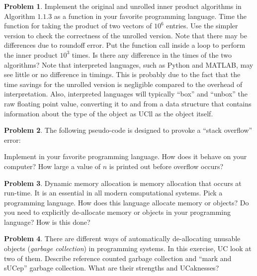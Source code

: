 \documentclass{article}
\theoremstyle{definition}
\newtheorem{problem}{Problem}[subsection]
\newcommand{\courier}[1]{{\fontfamily{pcr}\selectfont#1}}
\begin{document}
	\newpage
	\setcounter{problem}{3}
	\begin{problem}
		Implement the original and unrolled inner product algorithms in Algorithm \(1.1.3\) as a function in your favorite programming language. Time the function for taking the product of two vectors of \(10^6\) entries. Use the simpler version to check the correctness of the unrolled version. Note that there may be differences due to roundoff error. Put the function call inside a loop to perform the inner product \(10^3\) times. Is there any difference in the times of the two algorithms? Note	that interpreted languages, such as Python and MATLAB, may see little or no difference in timings. This is probably due to the fact that the time savings for the unrolled version is negligible compared to the overhead of interpretation. Also, interpreted languages will typically ``box'' and ``unbox'' the raw floating point value, converting it to and from a data structure that contains information about the type of the object as UCll as the object itself.
	\end{problem}
	
	\newpage
	\setcounter{problem}{4}
	\begin{problem}
		The following pseudo-code is designed to provoke a ``stack overflow'' error:
		\begin{figure*}[h!]
			\centering 
			\begin{algorithmic}
						\State \courier{print(\(n\))}
					\EndIf
					\State \courier{OVERFLOW(\(n+1\))}
				\EndFunction
			\end{algorithmic}
		\end{figure*}
	
	
	\noindent Implement in your favorite programming language. How does it behave on your
	computer? How large a value of \(n\) is printed out before overflow occurs?
	\end{problem}
	
	\newpage
	\setcounter{problem}{5}
	\begin{problem}
		Dynamic memory allocation is memory allocation that occurs at run-time. It is
		an essential in all modern computational systems. Pick a programming language.
		How does this language allocate memory or objects? Do you need to explicitly
		de-allocate memory or objects in your programming language? How is this done?
	\end{problem}
	
	\newpage
	\setcounter{problem}{6}
	\begin{problem}
		There are different ways of automatically de-allocating unusable objects (\textit{garbage collection}) in programming systems. In this exercise, UC look at two of them. Describe reference counted garbage collection and ``mark and sUCep'' garbage collection. What are their strengths and UCaknesses?
	\end{problem}
	
\end{document}
